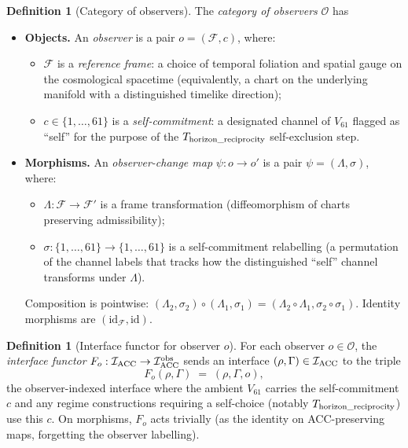 \documentclass[11pt]{article}
\theoremstyle{plain}
\theoremstyle{definition}
\newtheorem{definition}[theorem]{Definition}
\theoremstyle{remark}
\begin{document}
\begin{definition}[Category of observers]\label{def:category_observers}
The \emph{category of observers} $\mathcal{O}$ has
\begin{itemize}[leftmargin=2em,itemsep=2pt]
  \item \textbf{Objects.}  An \emph{observer} is a pair $o = (\mathcal{F}, c)$, where:
  \begin{itemize}[leftmargin=1.5em,itemsep=1pt]
    \item $\mathcal{F}$ is a \emph{reference frame}: a choice of temporal foliation and spatial gauge on the cosmological spacetime (equivalently, a chart on the underlying manifold with a distinguished timelike direction);
    \item $c \in \{1, \dots, 61\}$ is a \emph{self-commitment}: a designated channel of $V_{61}$ flagged as ``self'' for the purpose of the $T_{\rm horizon\_reciprocity}$ self-exclusion step.
  \end{itemize}
  \item \textbf{Morphisms.}  An \emph{observer-change map} $\psi : o \to o'$ is a pair $\psi = (\Lambda, \sigma)$, where:
  \begin{itemize}[leftmargin=1.5em,itemsep=1pt]
    \item $\Lambda : \mathcal{F} \to \mathcal{F}'$ is a frame transformation (diffeomorphism of charts preserving admissibility);
    \item $\sigma : \{1, \dots, 61\} \to \{1, \dots, 61\}$ is a self-commitment relabelling (a permutation of the channel labels that tracks how the distinguished ``self'' channel transforms under $\Lambda$).
  \end{itemize}
  Composition is pointwise: $(\Lambda_2, \sigma_2) \circ (\Lambda_1, \sigma_1) = (\Lambda_2 \circ \Lambda_1, \sigma_2 \circ \sigma_1)$.  Identity morphisms are $(\mathrm{id}_\mathcal{F}, \mathrm{id})$.
\end{itemize}
\end{definition}

\begin{definition}[Interface functor for observer $o$]\label{def:interface_functor}
For each observer $o \in \mathcal{O}$, the \emph{interface functor} $F_o : \mathcal{I}_{\rm ACC} \to \mathcal{I}_{\rm ACC}^{\rm obs}$ sends an interface $(\rho, \Gamma) \in \mathcal{I}_{\rm ACC}$ to the triple
\[
  F_o(\rho, \Gamma) \;=\; (\rho, \Gamma, o),
\]
the observer-indexed interface where the ambient $V_{61}$ carries the self-commitment $c$ and any regime constructions requiring a self-choice (notably $T_{\rm horizon\_reciprocity}$) use this $c$.  On morphisms, $F_o$ acts trivially (as the identity on ACC-preserving maps, forgetting the observer labelling).
\end{definition}
\end{document}
